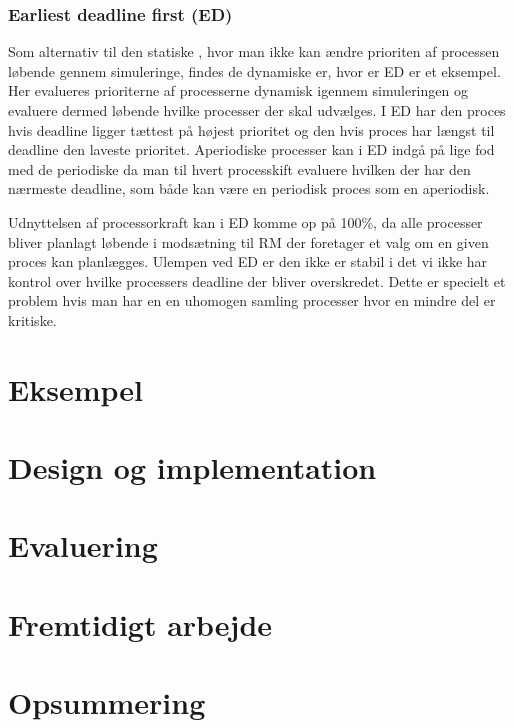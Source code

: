 \subsubsection{Earliest deadline first (ED)}
Som alternativ til den statiske \sched, hvor man ikke kan ændre prioriten af processen løbende gennem simuleringe, findes de dynamiske \sched er, hvor er ED er et eksempel. Her evalueres prioriterne af processerne dynamisk igennem simuleringen og evaluere dermed løbende hvilke processer der skal udvælges. I ED har den proces hvis deadline ligger tættest på højest prioritet og den hvis proces har længst til deadline den laveste prioritet. Aperiodiske processer kan i ED indgå på lige fod med de periodiske da man til hvert processkift evaluere hvilken der har den nærmeste deadline, som både kan være en periodisk proces som en aperiodisk.

Udnyttelsen af processorkraft kan i ED komme op på 100\%, da alle processer bliver planlagt løbende i modsætning til RM der foretager et valg om en given proces kan planlægges.  Ulempen ved ED er den ikke er stabil i det vi ikke har kontrol over hvilke processers deadline der bliver overskredet. Dette er specielt et problem hvis man har en en uhomogen samling processer hvor en mindre del er kritiske.


  \section{Eksempel}
  \section{Design og implementation}
  \section{Evaluering}
  \section{Fremtidigt arbejde}
  \section{Opsummering}
